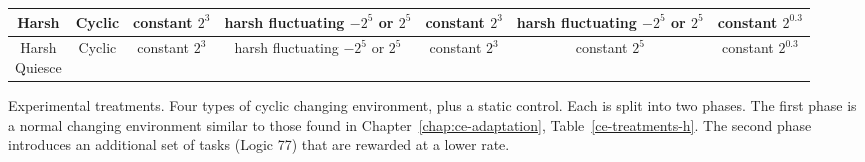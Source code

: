 \documentclass[PhD]{msu-thesis}
\begin{document}
\begin{table}[]
\begin{tabular}{|c|c||c|c||c|c|c|}
	Harsh & Cyclic & \makecell{constant \\ $2^3$} & \makecell{harsh \\ fluctuating \\ $-2^5$ or $2^5$} & \makecell{constant \\ $2^3$} & \makecell{harsh \\ fluctuating \\ $-2^5$ or $2^5$} & \makecell{constant \\ $2^{0.3}$} \\\hline
	\makecell{Harsh \\ Quiesce} & Cyclic & \makecell{constant \\ $2^3$} & \makecell{harsh \\ fluctuating \\ $-2^5$ or $2^5$} & \makecell{constant \\ $2^3$} & \makecell{constant \\ $2^5$} & \makecell{constant \\ $2^{0.3}$} \\\hline
	\end{tabular} 

	\begin{flushleft} Experimental treatments. Four types of cyclic changing environment, plus a static control. Each is split into two phases.
    The first phase is a normal changing environment similar to those found in Chapter~\ref{chap:ce-adaptation}, Table~\ref{ce-treatments-h}. The second phase introduces an additional set of tasks (Logic 77) that are rewarded at a lower rate.
	\end{flushleft}
	\label{cel-treatments}
	\end{table}

\end{document}
